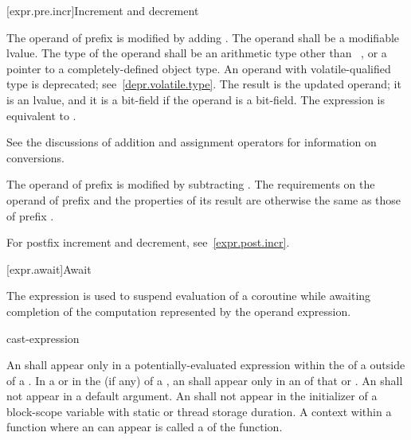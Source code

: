 [expr.pre.incr]{Increment and decrement}

\pnum
{}%
%
The operand of prefix \tcode{++}
%
%
is modified by adding .
%
The operand shall be a modifiable lvalue. The type of the operand shall
be an arithmetic type other than \cv{}~,
or a pointer to a completely-defined object type.
An operand with volatile-qualified type is deprecated;
see~\ref{depr.volatile.type}.
The result is the updated operand; it is an lvalue, and it is a
bit-field if the operand is a bit-field.
The expression  is equivalent to .
%
\begin{note}
See the discussions of addition and assignment
operators for information on conversions.
\end{note}

\pnum
The operand of prefix
%
\tcode{\dcr} is modified by subtracting .
The requirements on the operand of prefix
\tcode{\dcr} and the properties of its result are otherwise the same as
those of prefix \tcode{++}.
\begin{note}
For postfix increment and decrement, see~\ref{expr.post.incr}.
\end{note}

[expr.await]{Await}
%
%

\pnum
The  expression is used to suspend evaluation of a
coroutine while awaiting completion of
the computation represented by the operand expression.

\begin{bnf}
\br
     cast-expression
\end{bnf}

\pnum
An  shall appear only in a potentially-evaluated
expression within the  of a
 outside of a .
In a  or in the
 (if any)
of a , an 
shall appear only in an  of that
 or .
An  shall not appear in a
default argument.
An  shall not appear in the initializer of
a block-scope variable with static or thread storage duration.
A context within a function where an  can appear
is called a  of the function.

